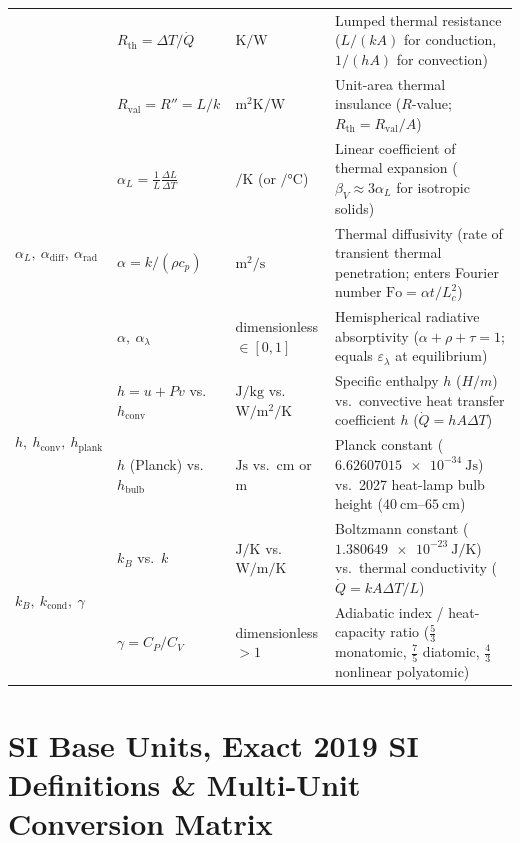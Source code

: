 \begin{center}
\begin{tabularx}{\linewidth}{@{}l l l X@{}}
 & $R_{\mathrm{th}} = \Delta T / \dot{Q}$ & $\si{\kelvin\per\watt}$ & Lumped thermal resistance ($L/(kA)$ for conduction, $1/(hA)$ for convection) \\
 & $R_{\mathrm{val}} = R'' = L/k$ & $\si{\square\meter\kelvin\per\watt}$ & Unit-area thermal insulance ($R$-value; $R_{\mathrm{th}} = R_{\mathrm{val}}/A$) \\\midrule
\multirow{3}{*}{$\alpha_L,\ \alpha_{\mathrm{diff}},\ \alpha_{\mathrm{rad}}$} & $\alpha_L = \frac{1}{L}\frac{\Delta L}{\Delta T}$ & $\si{\per\kelvin}$ (or $\si{\per\celsius}$) & Linear coefficient of thermal expansion ($\beta_V \approx 3\alpha_L$ for isotropic solids) \\
 & $\alpha = k/(\rho c_p)$ & $\si{\square\meter\per\second}$ & Thermal diffusivity (rate of transient thermal penetration; enters Fourier number $\mathrm{Fo} = \alpha t/L_c^2$) \\
 & $\alpha,\ \alpha_\lambda$ & dimensionless $\in [0,1]$ & Hemispherical radiative absorptivity ($\alpha + \rho + \tau = 1$; equals $\varepsilon_\lambda$ at equilibrium) \\\midrule
\multirow{2}{*}{$h,\ h_{\mathrm{conv}},\ h_{\mathrm{plank}}$} & $h = u + Pv$ vs.\ $h_{\mathrm{conv}}$ & $\si{\joule\per\kilogram}$ vs.\ $\si{\watt\per\square\meter\per\kelvin}$ & Specific enthalpy $h$ ($H/m$) vs.\ convective heat transfer coefficient $h$ ($\dot{Q} = hA\Delta T$) \\
 & $h$ (Planck) vs.\ $h_{\mathrm{bulb}}$ & $\si{\joule\second}$ vs.\ $\si{\centi\meter}$ or $\si{\meter}$ & Planck constant ($\SI{6.62607015e-34}{\joule\second}$) vs.\ 2027 heat-lamp bulb height ($\SIrange{40}{65}{\centi\meter}$) \\\midrule
\multirow{2}{*}{$k_B,\ k_{\mathrm{cond}},\ \gamma$} & $k_B$ vs.\ $k$ & $\si{\joule\per\kelvin}$ vs.\ $\si{\watt\per\meter\per\kelvin}$ & Boltzmann constant ($\SI{1.380649e-23}{\joule\per\kelvin}$) vs.\ thermal conductivity ($\dot{Q} = kA\Delta T/L$) \\
 & $\gamma = C_P/C_V$ & dimensionless $>1$ & Adiabatic index / heat-capacity ratio ($\tfrac{5}{3}$ monatomic, $\tfrac{7}{5}$ diatomic, $\tfrac{4}{3}$ nonlinear polyatomic) \\\bottomrule
\end{tabularx}
\end{center}

\section{SI Base Units, Exact 2019 SI Definitions \& Multi-Unit Conversion Matrix}
\label{sec:02.3}

